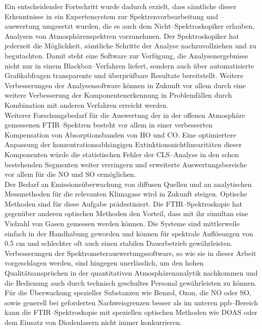Ein entscheidender Fortschritt wurde dadurch erzielt, dass
s\"{a}mtliche dieser Erkenntnisse in ein Expertensystem zur
Spektrenvorbearbeitung und --auswertung umgesetzt wurden, die es
auch dem Nicht--Spektroskopiker erlauben, Analysen von
Atmosph\"{a}renspektren vorzunehmen. Der Spektroskopiker hat jederzeit
die M\"{o}glichkeit, s\"{a}mtliche Schritte der Analyse nachzuvollziehen
und zu begutachten. Damit steht eine Software zur Verf\"{u}gung, die
Analysenergebnisse nicht nur in einem Blackbox--Verfahren liefert,
sondern auch \"{u}ber automatisierte Grafikabfragen transparente und
\"{u}berpr\"{u}fbare Resultate bereitstellt. Weitere Verbesserungen der
Analysensoftware k\"{o}nnen in Zukunft vor allem durch eine weitere
Verbesserung der Komponentenerkennung in Problemf\"{a}llen durch
Kombination mit anderen Verfahren erreicht werden.\\

Weiterer Forschungsbedarf f\"{u}r die Auswertung der in der offenen
Atmosph\"{a}re gemessenen FTIR--Spektren besteht vor allem in einer
verbesserten Kompensation von Absorptionsbanden von HO und
CO. Eine optimiertere Anpassung der
konzentrationsabh\"{a}ngigen Extinktionsnichtlinearit\"{a}ten dieser
Komponenten w\"{u}rde die statistischen Fehler der CLS--Analyse in den
schon bestehenden Segmenten weiter verringern und erweiterte
Auswertungsbereiche vor allem f\"{u}r die NO und SO
erm\"{o}glichen.\\

Der Bedarf an Emissions\"{u}berwachung von diffusen Quellen und an
analytischen Messmethoden f\"{u}r die relevanten Klimagase wird in
Zukunft steigen. Optische Methoden sind f\"{u}r diese Aufgabe
pr\"{a}destiniert. Die FTIR--Spektroskopie hat gegen\"{u}ber anderen
optischen Methoden den Vorteil, dass mit ihr simultan eine
Vielzahl von Gasen gemessen werden k\"{o}nnen. Die Systeme sind
mittlerweile einfach in der Handhabung geworden und k\"{o}nnen f\"{u}r
spektrale Aufl\"{o}sungen von 0.5 cm und schlechter oft auch
einen stabilen Dauerbetrieb gew\"{a}hrleisten. Verbesserungen der
Spektrometerauswertungssoftware, so wie sie in dieser Arbeit
vorgeschlagen werden, sind hingegen unerl\"{a}sslich, um den hohen
Qualit\"{a}tsanspr\"{u}chen in der quantitativen Atmosph\"{a}renanalytik
nachkommen und die Bedienung auch durch technisch geschultes
Personal gew\"{a}hrleisten zu k\"{o}nnen. F\"{u}r die \"{U}berwachung spezieller
Substanzen wie Benzol, Ozon, die NO oder SO, sowie
generell bei geforderten Nachweisgrenzen besser als im unteren
ppb--Bereich kann die FTIR--Spektroskopie mit speziellen optischen
Methoden wie DOAS oder dem Einsatz von Diodenlasern nicht immer
konkurrieren.

\cleardoublepage
